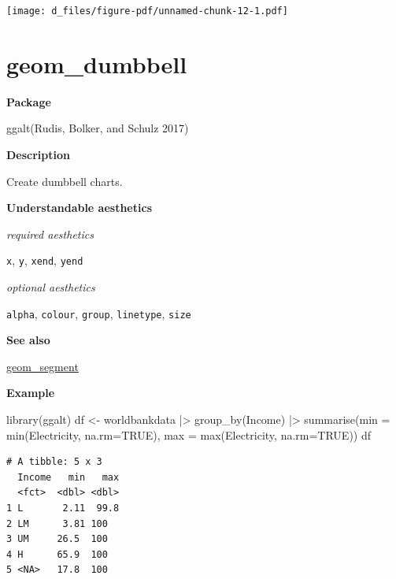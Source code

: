 \documentclass[
  letterpaper,
  DIV=11,
  numbers=noendperiod]{scrreprt}
\newenvironment{Shaded}{\begin{snugshade}}{\end{snugshade}}
\newcommand{\AttributeTok}[1]{\textcolor[rgb]{0.40,0.45,0.13}{#1}}
\newcommand{\ConstantTok}[1]{\textcolor[rgb]{0.56,0.35,0.01}{#1}}
\newcommand{\FunctionTok}[1]{\textcolor[rgb]{0.28,0.35,0.67}{#1}}
\newcommand{\NormalTok}[1]{\textcolor[rgb]{0.00,0.23,0.31}{#1}}
\newcommand{\OtherTok}[1]{\textcolor[rgb]{0.00,0.23,0.31}{#1}}
\newcommand{\SpecialCharTok}[1]{\textcolor[rgb]{0.37,0.37,0.37}{#1}}
\begin{document}
\texttt{[image: d\_files/figure-pdf/unnamed-chunk-12-1.pdf]}

\section{geom\_dumbbell}\label{geom_dumbbell}

\textbf{Package}

ggalt(Rudis, Bolker, and Schulz 2017)

\textbf{Description}

Create dumbbell charts.

\textbf{Understandable aesthetics}

\emph{required aesthetics}

\texttt{x}, \texttt{y}, \texttt{xend}, \texttt{yend}

\emph{optional aesthetics}

\texttt{alpha}, \texttt{colour}, \texttt{group}, \texttt{linetype},
\texttt{size}

\textbf{See also}

\hyperref[segment]{geom\_segment}

\textbf{Example}

\begin{Shaded}
\begin{Highlighting}[]
\FunctionTok{library}\NormalTok{(ggalt)}
\NormalTok{df }\OtherTok{\textless{}{-}}\NormalTok{ worldbankdata }\SpecialCharTok{|\textgreater{}}
  \FunctionTok{group\_by}\NormalTok{(Income) }\SpecialCharTok{|\textgreater{}}
  \FunctionTok{summarise}\NormalTok{(}\AttributeTok{min =} \FunctionTok{min}\NormalTok{(Electricity, }\AttributeTok{na.rm=}\ConstantTok{TRUE}\NormalTok{), }\AttributeTok{max =} \FunctionTok{max}\NormalTok{(Electricity, }\AttributeTok{na.rm=}\ConstantTok{TRUE}\NormalTok{))}
\NormalTok{df}
\end{Highlighting}
\end{Shaded}

\begin{verbatim}
# A tibble: 5 x 3
  Income   min   max
  <fct>  <dbl> <dbl>
1 L       2.11  99.8
2 LM      3.81 100  
3 UM     26.5  100  
4 H      65.9  100  
5 <NA>   17.8  100  
\end{verbatim}
\end{document}
